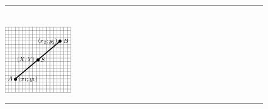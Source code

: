 	\begin{figure}[H] %
    \begin{center}
    \rule[.1in]{\figurerulewidth}{.005in} \\
        \label{m39119*uid44!!!underscore!!!media}\label{m39119*uid44!!!underscore!!!printimage}\includegraphics{col11306.imgs/m39119_MG10C14_019.png} %
        
      \vspace{2pt}
    \vspace{.1in}
    \rule[.1in]{\figurerulewidth}{.005in} \\
        
    \end{center}

 \end{figure}   

    \addtocounter{footnote}{-0}
    
